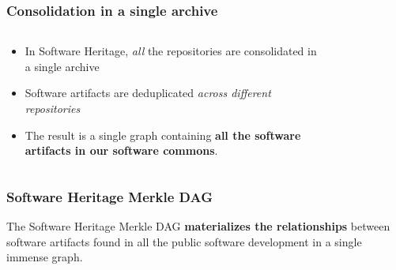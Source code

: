 \documentclass[aspectratio=169,xcolor=table]{beamer}
\begin{document}
    \begin{frame}
        \frametitle{Consolidation in a single archive}

        \begin{columns}
            \begin{block}{}
                \begin{itemize}
                    \item In Software Heritage, \emph{all} the repositories are
                        consolidated in a single archive
                    \item Software artifacts are deduplicated \emph{across
                        different repositories}
                    \item The result is a single graph containing \textbf{all
                        the software artifacts in our software commons}.
                \end{itemize}
            \end{block}
            \begin{figure}
                \centering
                \scalebox{0.5}{}
            \end{figure}
        \end{columns}
    \end{frame}

    \begin{frame}
        \frametitle{Software Heritage Merkle DAG}
        \begin{block}{}
            The Software Heritage Merkle DAG \textbf{materializes the
            relationships} between software artifacts found in all the public
            software development in a single immense graph.
        \end{block}
        \vfill
        \begin{figure}
            \centering
            \scalebox{0.7}{}
        \end{figure}
    \end{frame}
\end{document}
